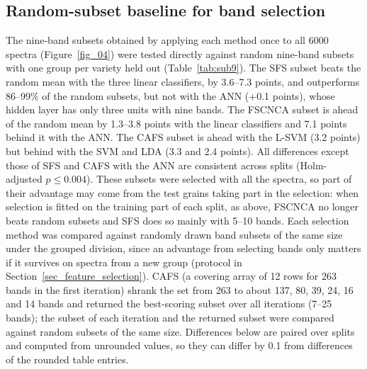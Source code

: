 \documentclass[final,5p,times,twocolumn]{elsarticle}
\newcommand{\added}[1]{#1}
\begin{document}
\subsection{Random-subset baseline for band selection}\label{sec_bands_results}

\added{The nine-band subsets obtained by applying each method once to all 6000 spectra (Figure~\ref{fig_04}) were tested directly against random nine-band subsets with one group per variety held out (Table~\ref{tab:sub9}). The SFS subset beats the random mean with the three linear classifiers, by 3.6--7.3 points, and outperforms 86--99\% of the random subsets, but not with the ANN (+0.1 points), whose hidden layer has only three units with nine bands. The FSCNCA subset is ahead of the random mean by 1.3--3.8 points with the linear classifiers and 7.1 points behind it with the ANN. The CAFS subset is ahead with the L-SVM (3.2 points) but behind with the SVM and LDA (3.3 and 2.4 points). All differences except those of SFS and CAFS with the ANN are consistent across splits (Holm-adjusted $p\le0.004$). These subsets were selected with all the spectra, so part of their advantage may come from the test grains taking part in the selection: when selection is fitted on the training part of each split, as above, FSCNCA no longer beats random subsets and SFS does so mainly with 5--10 bands.}
\added{Each selection method was compared against randomly drawn band subsets of the same size under the grouped division, since an advantage from selecting bands only matters if it survives on spectra from a new group (protocol in Section~\ref{sec_feature_selection}). CAFS (a covering array of 12 rows for 263 bands in the first iteration) shrank the set from 263 to about 137, 80, 39, 24, 16 and 14 bands and returned the best-scoring subset over all iterations (7--25 bands); the subset of each iteration and the returned subset were compared against random subsets of the same size. Differences below are paired over splits and computed from unrounded values, so they can differ by 0.1 from differences of the rounded table entries.}
\end{document}
